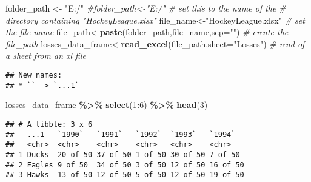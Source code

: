 \documentclass[
]{article}
\newenvironment{Shaded}{\begin{snugshade}}{\end{snugshade}}
\newcommand{\AttributeTok}[1]{\textcolor[rgb]{0.13,0.29,0.53}{#1}}
\newcommand{\CommentTok}[1]{\textcolor[rgb]{0.56,0.35,0.01}{\textit{#1}}}
\newcommand{\DecValTok}[1]{\textcolor[rgb]{0.00,0.00,0.81}{#1}}
\newcommand{\FunctionTok}[1]{\textcolor[rgb]{0.13,0.29,0.53}{\textbf{#1}}}
\newcommand{\NormalTok}[1]{#1}
\newcommand{\OtherTok}[1]{\textcolor[rgb]{0.56,0.35,0.01}{#1}}
\newcommand{\SpecialCharTok}[1]{\textcolor[rgb]{0.81,0.36,0.00}{\textbf{#1}}}
\newcommand{\StringTok}[1]{\textcolor[rgb]{0.31,0.60,0.02}{#1}}
\begin{document}
\begin{Shaded}
\begin{Highlighting}[]
\NormalTok{folder\_path }\OtherTok{\textless{}{-}} \StringTok{"E:/"}
\CommentTok{\#folder\_path\textless{}{-}"E:/" \# set this to the name of the}
\CommentTok{\# directory containing "HockeyLeague.xlsx"}
\NormalTok{file\_name}\OtherTok{\textless{}{-}}\StringTok{"HockeyLeague.xlsx"} \CommentTok{\# set the file name}
\NormalTok{file\_path}\OtherTok{\textless{}{-}}\FunctionTok{paste}\NormalTok{(folder\_path,file\_name,}\AttributeTok{sep=}\StringTok{""}\NormalTok{) }\CommentTok{\# create the file\_path}
\NormalTok{losses\_data\_frame}\OtherTok{\textless{}{-}}\FunctionTok{read\_excel}\NormalTok{(file\_path,}\AttributeTok{sheet=}\StringTok{"Losses"}\NormalTok{) }\CommentTok{\# read of a sheet from an xl file}
\end{Highlighting}
\end{Shaded}

\begin{verbatim}
## New names:
## * `` -> `...1`
\end{verbatim}

\begin{Shaded}
\begin{Highlighting}[]
\NormalTok{losses\_data\_frame }\SpecialCharTok{\%\textgreater{}\%}
  \FunctionTok{select}\NormalTok{(}\DecValTok{1}\SpecialCharTok{:}\DecValTok{6}\NormalTok{) }\SpecialCharTok{\%\textgreater{}\%}
  \FunctionTok{head}\NormalTok{(}\DecValTok{3}\NormalTok{)}
\end{Highlighting}
\end{Shaded}

\begin{verbatim}
## # A tibble: 3 x 6
##   ...1   `1990`   `1991`   `1992`  `1993`   `1994`  
##   <chr>  <chr>    <chr>    <chr>   <chr>    <chr>   
## 1 Ducks  20 of 50 37 of 50 1 of 50 30 of 50 7 of 50 
## 2 Eagles 9 of 50  34 of 50 3 of 50 12 of 50 16 of 50
## 3 Hawks  13 of 50 12 of 50 5 of 50 12 of 50 19 of 50
\end{verbatim}
\end{document}

